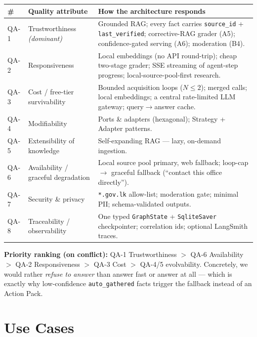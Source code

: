 \documentclass[11pt,a4paper]{article}
\begin{document}
\begin{center}
\begin{tabularx}{\linewidth}{@{}l l Y@{}}
\toprule
\textbf{\#} & \textbf{Quality attribute} & \textbf{How the architecture responds} \\
\midrule
QA-1 & Trustworthiness \emph{(dominant)} & Grounded RAG; every fact carries \texttt{source\_id} +
\texttt{last\_verified}; corrective-RAG grader (A5); confidence-gated serving (A6); moderation (B4). \\
QA-2 & Responsiveness & Local embeddings (no API round-trip); cheap two-stage grader; SSE streaming of
agent-step progress; local-source-pool-first research. \\
QA-3 & Cost / free-tier survivability & Bounded acquisition loops ($N\le2$); merged calls; local
embeddings; a central rate-limited LLM gateway; query$\to$answer cache. \\
QA-4 & Modifiability & Ports \& adapters (hexagonal); Strategy + Adapter patterns. \\
QA-5 & Extensibility of knowledge & Self-expanding RAG --- lazy, on-demand ingestion. \\
QA-6 & Availability / graceful degradation & Local source pool primary, web fallback; loop-cap
$\to$ graceful fallback (``contact this office directly''). \\
QA-7 & Security \& privacy & \texttt{*.gov.lk} allow-list; moderation gate; minimal PII; schema-validated
outputs. \\
QA-8 & Traceability / observability & One typed \texttt{GraphState} + \texttt{SqliteSaver} checkpointer;
correlation ids; optional LangSmith traces. \\
\bottomrule
\end{tabularx}
\end{center}

\noindent\textbf{Priority ranking (on conflict):} QA-1 Trustworthiness $>$ QA-6 Availability $>$
QA-2 Responsiveness $>$ QA-3 Cost $>$ QA-4/5 evolvability. Concretely, we would rather \emph{refuse
to answer} than answer fast or answer at all --- which is exactly why low-confidence
\texttt{auto\_gathered} facts trigger the fallback instead of an Action Pack.

\section{Use Cases}
\label{sec:usecases}
\end{document}
